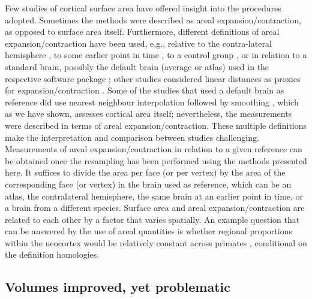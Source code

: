 Few studies of cortical surface area have offered insight into the procedures adopted. Sometimes the methods were described as areal expansion/contraction, as opposed to surface area itself. Furthermore, different definitions of areal expansion/contraction have been used, e.g., relative to the contra-lateral hemisphere \cite{Lyttelton2009}, to some earlier point in time \cite{Hill2010}, to a control group \cite{Palaniyappan2011}, or in relation to a standard brain, possibly the default brain (average or atlas) used in the respective software package \cite{Joyner2009, Rimol2010_pnas, Rimol2012, Chen2011, Chen2012, Vuoksimaa2016}; other studies considered linear distances as proxies for expansion/contraction \cite{Sun2009_sr, Sun2009_mp}. Some of the studies that used a default brain as reference did use nearest neighbour interpolation followed by smoothing \cite{Joyner2009, Rimol2010_pnas, Rimol2012}, which as we have shown, assesses cortical area itself; nevertheless, the measurements were described in terms of areal expansion/contraction. These multiple definitions make the interpretation and comparison between studies challenging. Measurements of areal expansion/contraction in relation to a given reference can be obtained once the resampling has been performed using the methods presented here. It suffices to divide the area per face (or per vertex) by the area of the corresponding face (or vertex) in the brain used as reference, which can be an atlas, the contralateral hemisphere, the same brain at an earlier point in time, or a brain from a different species. Surface area and areal expansion/contraction are related to each other by a factor that varies spatially. An example question that can be answered by the use of areal quantities is whether regional proportions within the neocortex would be relatively constant across primates \cite{Schoenemann2005, Barton2013, Gabi2016}, conditional on the definition homologies.

\subsection{Volumes improved, yet problematic}

